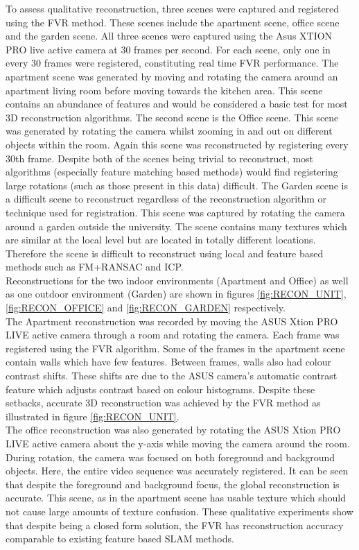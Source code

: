 To assess qualitative reconstruction, three scenes were captured and registered using the FVR method. These scenes include the apartment scene, office scene and the garden scene. All three scenes were captured using the Asus XTION PRO live active camera at 30 frames per second. For each scene, only one in every 30 frames were registered, constituting real time FVR performance. The apartment scene was generated by moving and rotating the camera around an apartment living room before moving towards the kitchen area. This scene contains an abundance of features and would be considered a basic test for most 3D reconstruction algorithms. The second scene is the Office scene. This scene was generated by rotating the camera whilst zooming in and out on different objects within the room. Again this scene was reconstructed by registering every 30th frame. Despite both of the scenes being trivial to reconstruct, most algorithms (especially feature matching based methods) would find registering large rotations (such as those present in this data) difficult. The Garden scene is a difficult scene to reconstruct regardless of the reconstruction algorithm or technique used for registration. This scene was captured by rotating the camera around a garden outside the university. The scene contains many textures which are similar at the local level but are located in totally different locations. Therefore the scene is difficult to reconstruct using local and feature based methods such as FM+RANSAC and ICP. \\


Reconstructions for the two indoor environments (Apartment and Office) as well as one outdoor environment (Garden) are shown in figures \ref{fig:RECON_UNIT}, \ref{fig:RECON_OFFICE} and \ref{fig:RECON_GARDEN} respectively. \\

The Apartment reconstruction was recorded by moving the ASUS Xtion PRO LIVE active camera through a room and rotating the camera. Each frame was registered using the FVR algorithm. Some of the frames in the apartment scene contain walls which have few features. Between frames, walls also had colour contrast shifts. These shifts are due to the ASUS camera's automatic contrast feature which adjusts contrast based on colour histograms. Despite these setbacks, accurate 3D reconstruction was achieved by the FVR method as illustrated in figure \ref{fig:RECON_UNIT}. \\


The office reconstruction was also generated by rotating the ASUS Xtion PRO LIVE active camera about the y-axis while moving the camera around the room. During rotation, the camera was focused on both foreground and background objects. Here, the entire video sequence was accurately registered. It can be seen that despite the foreground and background focus, the global reconstruction is accurate. This scene, as in the apartment scene has usable texture which should not cause large amounts of texture confusion. These qualitative experiments show that despite being a closed form solution, the FVR has reconstruction accuracy comparable to existing feature based SLAM methods. \\


